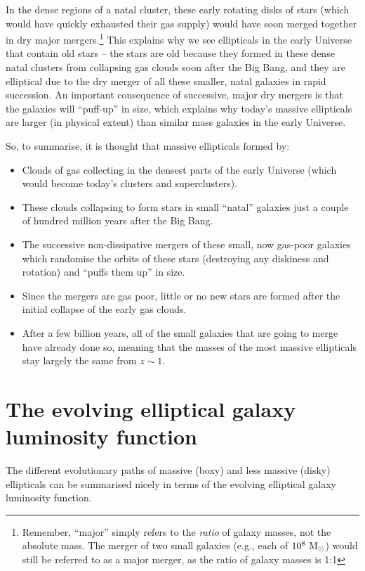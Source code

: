 \documentclass[11pt]{article}
\begin{document}
In the dense regions of a natal cluster, these early rotating disks of
stars (which would have quickly exhausted their gas supply) would have
soon merged together in dry major mergers.\footnote{Remember,
  ``major'' simply refers to the {\it ratio} of galaxy masses, not the
  absolute mass. The merger of two small galaxies (e.g., each of
  $10^8~{\rm M_\odot}$) would still be referred to as a major merger,
  as the ratio of galaxy masses is 1:1} This explains why we see
ellipticals in the early Universe that contain old stars -- the stars
are old because they formed in these dense natal clusters from
collapsing gas clouds soon after the Big Bang, and they are elliptical
due to the dry merger of all these smaller, natal galaxies in rapid
succession. An important consequence of successive, major dry mergers
is that the galaxies will ``puff-up'' in size, which explains why
today's massive ellipticals are larger (in physical extent) than
similar mass galaxies in the early Universe.

So, to summarise, it is thought that massive ellipticals formed by:
\begin{itemize}
\item Clouds of gas collecting in the densest parts of the early
  Universe (which would become today's clusters and superclusters).
\item These clouds collapsing to form stars in small ``natal''
  galaxies just a couple of hundred million years after the Big Bang.
\item The successive non-dissipative mergers of these small, now
  gas-poor galaxies which randomise the orbits of these stars
  (destroying any diskiness and rotation) and ``puffs them up'' in
  size.
\item Since the mergers are gas poor, little or no new stars are formed
  after the initial collapse of the early gas clouds.
\item After a few billion years, all of the small galaxies that are
  going to merge have already done so, meaning that the masses of the
  most massive ellipticals stay largely the same from $z\sim1$.
\end{itemize}

\section{The evolving elliptical galaxy luminosity function}
The different evolutionary paths of massive (boxy) and less massive
(disky) ellipticals can be summarised nicely in terms of the evolving
elliptical galaxy luminosity function.
\end{document}
